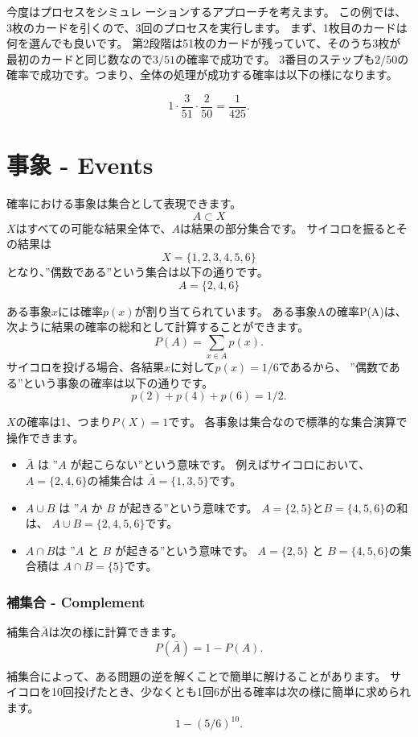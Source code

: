 今度はプロセスをシミュレ ーションするアプローチを考えます。
この例では、3枚のカードを引くので、3回のプロセスを実行します。
まず、1枚目のカードは何を選んでも良いです。
第2段階は51枚のカードが残っていて、そのうち3枚が最初のカードと同じ数なので$3/51$の確率で成功です。
3番目のステップも$2/50$の確率で成功です。つまり、全体の処理が成功する確率は以下の様になります。

\[1 \cdot \frac{3}{51} \cdot \frac{2}{50} = \frac{1}{425}.\]

\section{事象 - Events}

確率における事象は集合として表現できます。
\[A \subset X\]
$X$はすべての可能な結果全体で、$A$は結果の部分集合です。
サイコロを振るとその結果は
\[X = \{1,2,3,4,5,6\}\]
となり、''偶数である''という集合は以下の通りです。
\[A = \{2,4,6\}\]

ある事象$x$には確率$p(x)$が割り当てられています。
ある事象Aの確率P(A)は、次ように結果の確率の総和として計算することができます。
\[P(A) = \sum_{x \in A} p(x).\]
サイコロを投げる場合、各結果$x$に対して$p(x)=1/6$であるから、
''偶数である''という事象の確率は以下の通りです。
\[p(2)+p(4)+p(6)=1/2.\]

$X$の確率は1、つまり$P(X )=1$です。
各事象は集合なので標準的な集合演算で操作できます。

\begin{itemize}
\item {} $\bar A$ は
''$A$ が起こらない''という意味です。
例えばサイコロにおいて、$A=\{2,4,6\}$の補集合は
$\bar A = \{1,3,5\}$です。
\item {} $A \cup B$ は
''$A$ か $B$ が起きる''という意味です。
$A=\{2,5\}$と$B=\{4,5,6\}$の和は、
$A \cup B = \{2,4,5,6\}$です。
\item {} $A \cap B$は
''$A$ と $B$ が起きる''という意味です。
$A=\{2,5\}$ と $B=\{4,5,6\}$の集合積は
$A \cap B = \{5\}$です。
\end{itemize}

\subsubsection{補集合 - Complement}

補集合$\bar A$は次の様に計算できます。
\[P(\bar A)=1-P(A).\]

補集合によって、ある問題の逆を解くことで簡単に解けることがあります。
サイコロを10回投げたとき、少なくとも1回6が出る確率は次の様に簡単に求められます。
\[1-(5/6)^{10}.\]

